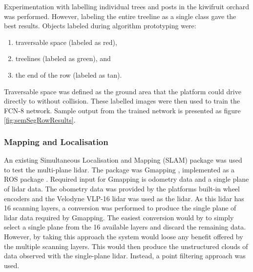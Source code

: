 \documentclass[preprint,authoryear,12pt]{elsarticle}
\begin{document}
        Experimentation with labelling individual trees and posts in the kiwifruit orchard was performed.
    	However, labeling the entire treeline as a single class gave the best results.
    	Objects labeled during algorithm prototyping were:
        \begin{enumerate}
        \item traversable space (labeled as red),
        \item treelines (labeled as green), and
        \item the end of the row (labeled as tan).
        \end{enumerate}
        Traversable space was defined as the ground area that the platform could drive directly to without collision.
        These labelled images were then used to train the FCN-8 network.
    	Sample output from the trained network is presented as figure \ref{fig:semSegRowResults}.

    \subsubsection{Mapping and Localisation}
        An existing Simultaneous Localisation and Mapping (SLAM) package was used to test the multi-plane lidar.
        The package was Gmapping \citep{Grisetti2007}, implemented as a ROS package \citep{Gerkey2010}.
    	Required input for Gmapping is odometry data and a single plane of lidar data.
        The obometry data was provided by the platforms built-in wheel encoders and the Velodyne VLP-16 lidar was used as the lidar.
    	As this lidar has 16 scanning layers, a conversion was performed to produce the single plane of lidar data required by Gmapping.
        The easiest conversion would by to simply select a single plane from the 16 available layers and discard the remaining data.
        However, by taking this approach the system would loose any benefit offered by the multiple scanning layers.
        This would then produce the unstructured clouds of data observed with the single-plane lidar.
        Instead, a point filtering approach was used.
\end{document}
